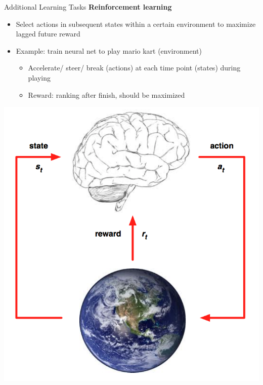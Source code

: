 \documentclass[11pt,compress,t,notes=noshow, xcolor=table]{beamer}
\begin{document}
\begin{vbframe}{Additional Learning Tasks}
\textbf{Reinforcement learning}

\begin{itemize}

  \item Select actions in subsequent  states within a certain environment to 
  maximize lagged future reward
  
  \item Example: train neural net to play mario kart (environment)
  
  \begin{itemize}
  
    \item Accelerate/ steer/ break (actions) at each time point (states) during 
    playing
    
    \item Reward: ranking after finish, should be maximized
  
  \end{itemize}

\end{itemize}

\begin{center}
  \includegraphics[height=0.45\textheight,keepaspectratio]{figure_man/state_action_reward_diagram.png}
\end{center}

\end{vbframe}


\endlecture
\end{document}
